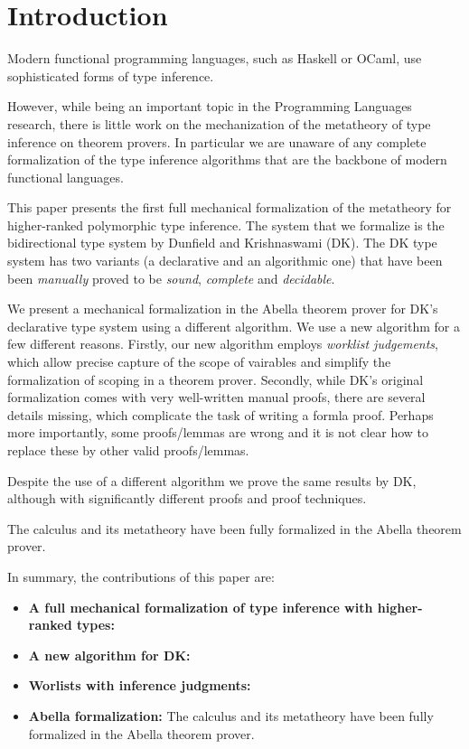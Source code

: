 \section{Introduction}

Modern functional programming languages, such as Haskell or OCaml,
use sophisticated forms of type inference. 

However, while being an
important topic in the Programming Languages research, there is little
work on the mechanization of the metatheory of type inference on
theorem provers. In particular we are unaware of any complete
formalization of the type inference algorithms that are the backbone of modern 
functional languages. 

This paper presents the first full mechanical formalization of the metatheory for
higher-ranked polymorphic type inference. The system that we formalize
is the bidirectional type system by Dunfield and
Krishnaswami (DK). The DK type system has two variants (a declarative
and an algorithmic one) that have been been \emph{manually} proved to be
\emph{sound}, \emph{complete} and \emph{decidable}. 

We present 
a mechanical formalization in the Abella theorem prover 
for DK's declarative type system using a different algorithm. We use a
new algorithm for a few different reasons. Firstly, our new algorithm
employs \emph{worklist judgements}, which allow precise capture of the
scope of vairables and simplify the formalization of scoping in a
theorem prover. Secondly, while DK's original formalization comes with very
well-written manual proofs, there are several details missing,
which complicate the task of writing a formla proof. 
Perhaps more importantly, some proofs/lemmas are wrong and it is
not clear how to replace these by other valid proofs/lemmas. 

Despite the use of a different algorithm we prove the
same results by DK, although with significantly different proofs and
proof techniques.  

The calculus and its metatheory
have been fully formalized in the Abella theorem prover\cite{AbellaDesc}. %

In summary, the contributions of this paper are:

\begin{itemize}

\item {\bf A full mechanical formalization of type inference with
    higher-ranked types:}

\item {\bf A new algorithm for DK:}

\item {\bf Worlists with inference judgments:}

\item {\bf Abella formalization:} The calculus and its metatheory
have been fully formalized in the Abella theorem prover\cite{AbellaDesc}.

\end{itemize}